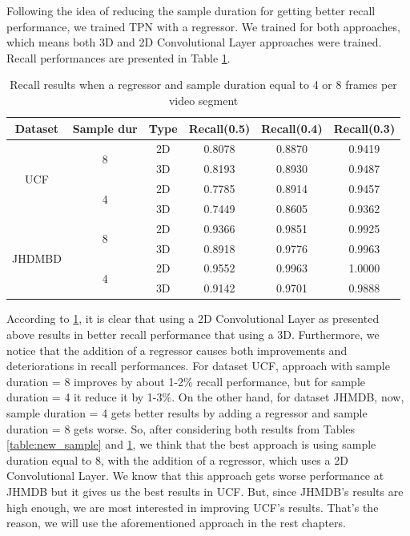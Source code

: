 Following the idea of reducing the sample duration for getting better recall performance, we trained TPN with a regressor. We trained for both approaches, which means both 3D and 2D Convolutional
Layer approaches were trained. Recall performances are presented in Table \ref{table:new_sample_reg}.

\begin{table}[h]
  \centering
  \begin{tabular}{|c | c | c || c c c|}
    \hline
    \textbf{Dataset} & \textbf{Sample dur} & \textbf{Type} & \textbf{Recall(0.5)} &  \textbf{Recall(0.4)} &  \textbf{Recall(0.3)} \\
    \hline
    \multirow{4}{*}{UCF} & \multirow{2}{*}{8} & 2D & 0.8078 & 0.8870 & 0.9419 \\
    \cline{3-6}
    {} & {} & 3D & 0.8193 & 0.8930 & 0.9487 \\
    \cline{2-6}
    {} & \multirow{2}{*}{4}& 2D & 0.7785 & 0.8914 & 0.9457 \\
    \cline{3-6}
    {} & {} & 3D & 0.7449 & 0.8605 & 0.9362 \\
    \hline
    \multirow{4}{*}{JHDMBD} & \multirow{2}{*}{8} & 2D &  0.9366 & 0.9851 & 0.9925  \\
    \cline{3-6}
    {} & {} & 3D & 0.8918 & 0.9776 & 0.9963  \\ 
    \cline{2-6}
    {} & \multirow{2}{*}{4}& 2D & 0.9552 & 0.9963 & 1.0000 \\
    \cline{3-6}
    {} & {} & 3D & 0.9142 & 0.9701 & 0.9888  \\
    \hline
    
  \end{tabular}
  \caption{Recall results when a regressor and sample duration equal to 4 or 8 frames per video segment}
  \label{table:new_sample_reg}
\end{table}

According to \ref{table:new_sample_reg}, it is clear that using a 2D Convolutional Layer as presented above results in better recall performance that using a 3D. Furthermore, we notice that
the addition of a regressor causes both improvements and deteriorations in recall performances. For dataset UCF, approach with sample duration = 8 improves by about 1-2\% recall performance,
but for sample duration = 4 it reduce it by 1-3\%. On the other hand, for dataset JHMDB, now, sample duration = 4 gets better results by adding a regressor and sample duration = 8 gets
worse. So, after considering both results from Tables \ref{table:new_sample} and \ref{table:new_sample_reg}, we think that the best approach is using sample duration equal to 8, with the
addition of a regressor, which uses a 2D Convolutional Layer. We know that this approach gets worse performance at JHMDB but it gives us the best results in UCF. But, since JHMDB's results are
high enough, we are most interested in improving UCF's results. That's the reason, we will use the aforementioned approach in the rest chapters.

